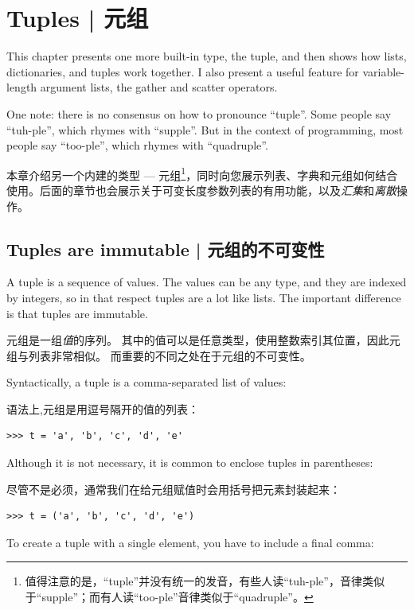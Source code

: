 \chapter{Tuples | 元组}
\label{tuplechap}

This chapter presents one more built-in type, the tuple, and then
shows how lists, dictionaries, and tuples work together.
I also present a useful feature for variable-length argument lists,
the gather and scatter operators.

One note: there is no consensus on how to pronounce ``tuple''.
Some people say ``tuh-ple'', which rhymes with ``supple''.  But
in the context of programming, most people say ``too-ple'', which
rhymes with ``quadruple''.

本章介绍另一个内建的类型 --- 元组\footnote{值得注意的是，``tuple''并没有统一的发音，有些人读``tuh-ple''，音律类似于``supple''；而有人读``too-ple''音律类似于``quadruple''。}，同时向您展示列表、字典和元组如何结合使用。后面的章节也会展示关于可变长度参数列表的有用功能，以及\emph{汇集}和\emph{离散}操作。

\section{Tuples are immutable | 元组的不可变性}

A tuple is a sequence of values.  The values can be any type, and
they are indexed by integers, so in that respect tuples are a lot
like lists.  The important difference is that tuples are immutable.

元组是一组\emph{值}的序列。  其中的值可以是任意类型，使用整数索引其位置，因此元组与列表非常相似。  而重要的不同之处在于元组的不可变性。

Syntactically, a tuple is a comma-separated list of values:

语法上,元组是用逗号隔开的值的列表：

\begin{lstlisting}
>>> t = 'a', 'b', 'c', 'd', 'e'
\end{lstlisting}
%
Although it is not necessary, it is common to enclose tuples in
parentheses:

尽管不是必须，通常我们在给元组赋值时会用括号把元素封装起来：


\begin{lstlisting}
>>> t = ('a', 'b', 'c', 'd', 'e')
\end{lstlisting}
%
To create a tuple with a single element, you have to include a final
comma:

